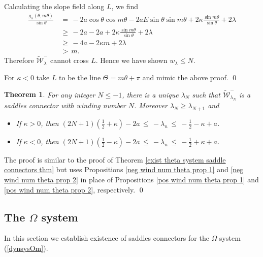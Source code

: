 \documentclass[11 pt]{article}
\newtheorem{thm}{Theorem}[section]
\renewcommand\l{\lambda}
\renewcommand\({\left(}
\renewcommand\){\right)}
\newcommand\wt{\widetilde}
\newcommand\<{\langle}
\renewcommand\>{\rangle}
\renewcommand\l{\lambda}
\newcommand\8{\infty}
\newcommand{\mc}{\mathcal}
\begin{document}
Calculating the slope field along $L$, we find
\begin{align*}
\frac{g_\l(\theta, m\theta)}{\sin \theta} \,&=\, -2a \cos\theta \cos m\theta - 2aE \sin \theta \sin m\theta + 2\kappa\frac{\sin m\theta}{\sin \theta} + 2\lambda      
\\
&\geq\, -2a - 2a + 2\kappa\frac{\sin m\theta }{\sin \theta} + 2\l
\\
&\geq\, -4a - 2\kappa m + 2\l
\\
&>\, m.
\end{align*}
Therefore $\wt{\mc{W}}^-_\l$ cannot cross $L$. Hence we have shown $w_\l \leq N$. 

For $\kappa < 0$ take $L$ to be the line $\Theta = m\theta + \pi$ and mimic the above proof. 
\qed

\medskip
\medskip


\begin{thm}\label{exist theta system saddle connectors thm for neg wind num}
For any integer $N \leq -1$, there is a unique $\l_{N}$ such that $\wt{\mc{W}}^-_{\l_{N}}$ is a saddles connector with winding number $N$. Moreover  $\l_{N} \geq \l_{N + 1}$ and
\begin{itemize}
\item[$\bullet$] If $\kappa > 0$, then $(2N+1)(\frac{1}{2}+\kappa) - 2a \,\leq \, -\l_{n} \,\leq\, -\frac{1}{2} - \kappa + a$.
\item[$\bullet$] If $\kappa < 0$, then  $(2N+1)(\frac{1}{2}-\kappa) - 2a \,\leq \, -\l_{n} \,\leq\, -\frac{1}{2} + \kappa + a$.
\end{itemize}
\end{thm}

\proof
The proof is similar to the proof of Theorem \ref{exist theta system saddle connectors thm} but uses Propositions \ref{neg wind num theta prop 1} and \ref{neg wind num theta prop 2} in place of Propositions \ref{pos wind num theta prop 1} and \ref{pos wind num theta prop 2}, respectively.
\qed



\medskip
\medskip


\subsection{The $\Omega$ system}\label{Om sec}

In this section we establish existence of saddles connectors for the $\Omega$ system (\ref{dynsysOm}). 
\end{document}
